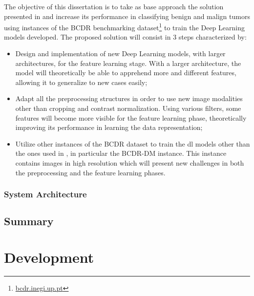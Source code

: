 \documentclass[
  twoside,
  11pt, a4paper,
  footinclude=true,
  headinclude=true,
  cleardoublepage=empty
]{scrbook}
\begin{document}
      The objective of this dissertation is to take as base approach the solution presented in \cite{arevalo2016representation} and increase its performance in classifying benign and malign tumors using instances of the BCDR benchmarking dataset\footnote{\href{bcdr.inegi.up.pt}{bcdr.inegi.up.pt}} to train the Deep Learning models developed. The proposed solution will consist in 3 steps characterized by:

      \begin{itemize}
        \item Design and implementation of new Deep Learning models, with larger architectures, for the feature learning stage. With a larger architecture, the model will theoretically be able to apprehend more and different features, allowing it to generalize to new cases easily;
        \item Adapt all the preprocessing structures in order to use new image modalities other than cropping and contrast normalization. Using various filters, some features will become more visible for the feature learning phase, theoretically improving its performance in learning the data representation;
        \item Utilize other instances of the BCDR dataset to train the \gls{dl} models other than the ones used in \cite{arevalo2016representation}, in particular the BCDR-DM instance. This instance contains images in high resolution which will present new challenges in both the preprocessing and the feature learning phases.
      \end{itemize}


      \subsection{System Architecture} \label{problem:proposal:architecture}

    \section{Summary} \label{problem:summary}

  \chapter{Development} \label{development}
\end{document}
